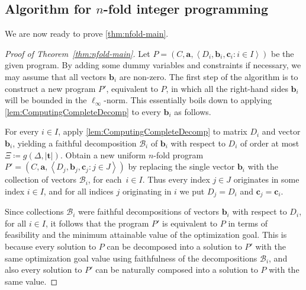 \documentclass{article}
\newcommand{\Bb}{\mathcal{B}}
\newcommand{\tup}[1]{{\mathbf{#1}}}
\newcommand{\tv}{\tup t}
\newcommand{\av}{\tup a}
\newcommand{\bb}{\tup b}
\newcommand{\cc}{\tup c}
\newcommand{\mset}[1]{\left\langle #1\right\rangle}
\begin{document}
\subsection{Algorithm for \texorpdfstring{$n$}{n}-fold integer programming}

We are now ready to prove \cref{thm:nfold-main}.

\begin{proof}[Proof of Theorem~\ref{thm:nfold-main}]
Let $P=(C,\av,\mset{D_i,\bb_i,\cc_i\colon i\in I})$ be the given program. By adding some dummy variables and constraints if necessary, we may assume that all vectors $\bb_i$ are non-zero. The first step of the algorithm is to construct a new program $P'$, equivalent to $P$, in which all the right-hand sides $\bb_i$ will be bounded in the $\ell_\infty$-norm. This essentially boils down to applying \cref{lem:ComputingCompleteDecomp} to every $\bb_i$ as follows.

For every $i\in I$, apply \cref{lem:ComputingCompleteDecomp} to matrix $D_i$ and vector $\bb_i$, yielding a faithful decomposition $\Bb_i$ of $\bb_i$ with respect to $D_i$ of order at most $\Xi\coloneqq g(\Delta,|\tv|)$. Obtain a new uniform $n$-fold program $P'=(C,\av,\mset{D_{j},\bb_{j},\cc_{j}\colon j\in J})$ by replacing the single vector $\bb_i$ with the collection of vectors $\Bb_i$, for each~$i\in I$. Thus every index $j\in J$ originates in some index $i\in I$, and for all indices $j$ originating in $i$ we put $D_{j}=D_i$ and $\cc_{j}=\cc_i$.

Since collections $\Bb_i$ were faithful decompositions of vectors $\bb_i$ with respect to $D_i$, for all $i\in I$, it follows that the program $P'$ is equivalent to $P$ in terms of feasibility and the minimum attainable value of the optimization goal. This is because every solution to $P$ can be decomposed into a solution to $P'$ with the same optimization goal value using faithfulness of the decompositions $\Bb_i$, and also every solution to $P'$ can be naturally composed into a solution to $P$ with the same value.


\end{proof}
\end{document}
